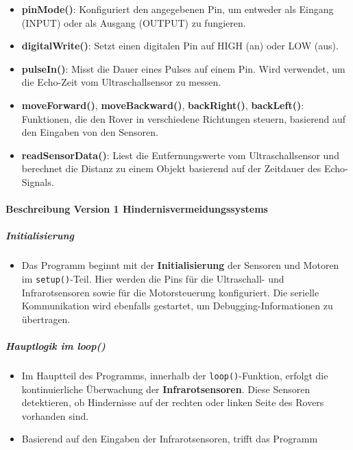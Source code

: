 \documentclass{vorlage-design-main}
\begin{document}
\begin{itemize}
\item
  \textbf{pinMode()}: Konfiguriert den angegebenen Pin, um entweder als
  Eingang (INPUT) oder als Ausgang (OUTPUT) zu fungieren.
\item
  \textbf{digitalWrite()}: Setzt einen digitalen Pin auf HIGH (an) oder
  LOW (aus).
\item
  \textbf{pulseIn()}: Misst die Dauer eines Pulses auf einem Pin. Wird
  verwendet, um die Echo-Zeit vom Ultraschallsensor zu messen.
\item
  \textbf{moveForward()}, \textbf{moveBackward()}, \textbf{backRight()},
  \textbf{backLeft()}: Funktionen, die den Rover in verschiedene
  Richtungen steuern, basierend auf den Eingaben von den Sensoren.
\item
  \textbf{readSensorData()}: Liest die Entfernungswerte vom
  Ultraschallsensor und berechnet die Distanz zu einem Objekt basierend
  auf der Zeitdauer des Echo-Signals.
\end{itemize}

\hypertarget{beschreibung-version-1-hindernisvermeidungssystems}{%
\paragraph{Beschreibung Version 1
Hindernisvermeidungssystems}\label{beschreibung-version-1-hindernisvermeidungssystems}}

\hypertarget{initialisierung}{%
\subparagraph{Initialisierung}\label{initialisierung}}

\begin{itemize}

\item
  Das Programm beginnt mit der \textbf{Initialisierung} der Sensoren und
  Motoren im \verb|setup()|-Teil. Hier werden die
  Pins für die Ultraschall- und Infrarotsensoren sowie für die
  Motorsteuerung konfiguriert. Die serielle Kommunikation wird ebenfalls
  gestartet, um Debugging-Informationen zu übertragen.
\end{itemize}

\hypertarget{hauptlogik-im-loop}{%
\subparagraph{Hauptlogik im loop()}\label{hauptlogik-im-loop}}

\begin{itemize}

\item
  Im Hauptteil des Programms, innerhalb der
  \verb|loop()|-Funktion, erfolgt die kontinuierliche
  Überwachung der \textbf{Infrarotsensoren}. Diese Sensoren detektieren,
  ob Hindernisse auf der rechten oder linken Seite des Rovers vorhanden
  sind.
\item
  Basierend auf den Eingaben der Infrarotsensoren, trifft das Programm
\end{itemize}
\end{document}
